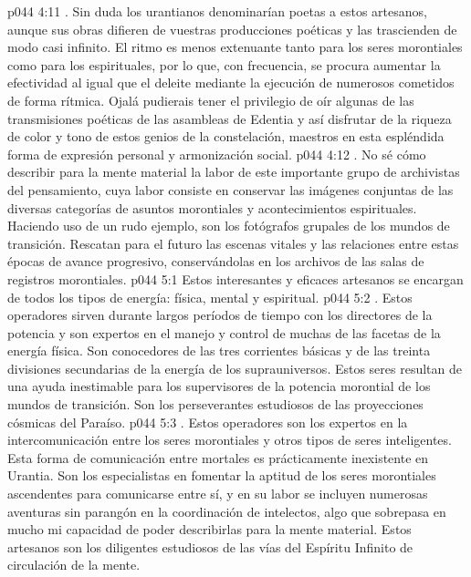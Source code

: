 \vs p044 4:11 . Sin duda los urantianos denominarían poetas a estos artesanos, aunque sus obras difieren de vuestras producciones poéticas y las trascienden de modo casi infinito. El ritmo es menos extenuante tanto para los seres morontiales como para los espirituales, por lo que, con frecuencia, se procura aumentar la efectividad al igual que el deleite mediante la ejecución de numerosos cometidos de forma rítmica. Ojalá pudierais tener el privilegio de oír algunas de las transmisiones poéticas de las asambleas de Edentia y así disfrutar de la riqueza de color y tono de estos genios de la constelación, maestros en esta espléndida forma de expresión personal y armonización social.
\vs p044 4:12 . No sé cómo describir para la mente material la labor de este importante grupo de archivistas del pensamiento, cuya labor consiste en conservar las imágenes conjuntas de las diversas categorías de asuntos morontiales y acontecimientos espirituales. Haciendo uso de un rudo ejemplo, son los fotógrafos grupales de los mundos de transición. Rescatan para el futuro las escenas vitales y las relaciones entre estas épocas de avance progresivo, conservándolas en los archivos de las salas de registros morontiales.
\vs p044 5:1 Estos interesantes y eficaces artesanos se encargan de todos los tipos de energía: física, mental y espiritual.
\vs p044 5:2 . Estos operadores sirven durante largos períodos de tiempo con los directores de la potencia y son expertos en el manejo y control de muchas de las facetas de la energía física. Son conocedores de las tres corrientes básicas y de las treinta divisiones secundarias de la energía de los suprauniversos. Estos seres resultan de una ayuda inestimable para los supervisores de la potencia morontial de los mundos de transición. Son los perseverantes estudiosos de las proyecciones cósmicas del Paraíso.
\vs p044 5:3 . Estos operadores son los expertos en la intercomunicación entre los seres morontiales y otros tipos de seres inteligentes. Esta forma de comunicación entre mortales es prácticamente inexistente en Urantia. Son los especialistas en fomentar la aptitud de los seres morontiales ascendentes para comunicarse entre sí, y en su labor se incluyen numerosas aventuras sin parangón en la coordinación de intelectos, algo que sobrepasa en mucho mi capacidad de poder describirlas para la mente material. Estos artesanos son los diligentes estudiosos de las vías del Espíritu Infinito de circulación de la mente.
